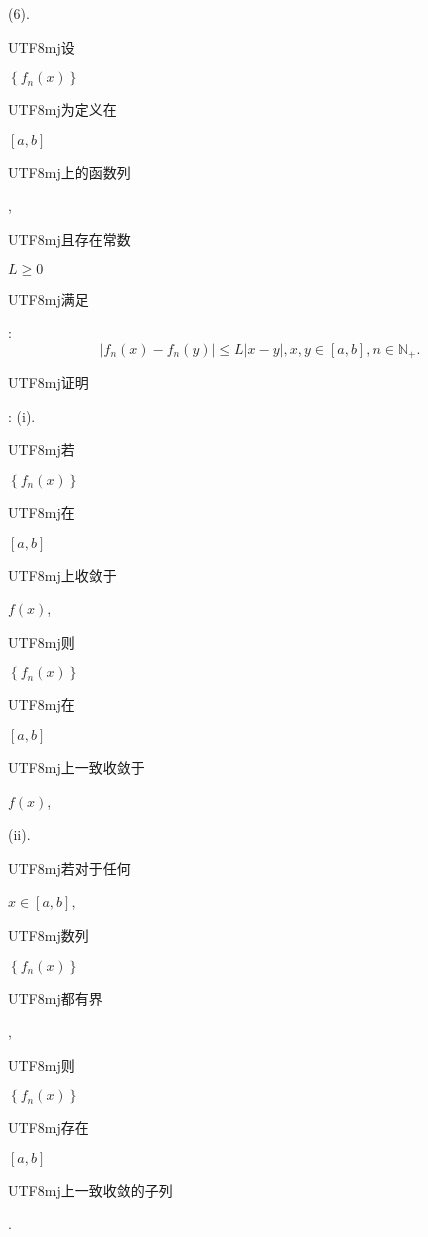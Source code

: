 \documentclass[10pt]{article}
\begin{document}
(6). \begin{CJK}{UTF8}{mj}设\end{CJK} $\left\{f_{n}(x)\right\}$ \begin{CJK}{UTF8}{mj}为定义在\end{CJK} $[a, b]$ \begin{CJK}{UTF8}{mj}上的函数列\end{CJK}, \begin{CJK}{UTF8}{mj}且存在常数\end{CJK} $L \geqslant 0$ \begin{CJK}{UTF8}{mj}满足\end{CJK}:
$$
\left|f_{n}(x)-f_{n}(y)\right| \leqslant L|x-y|, x, y \in[a, b], n \in \mathbb{N}_{+} .
$$
\begin{CJK}{UTF8}{mj}证明\end{CJK}: (i). \begin{CJK}{UTF8}{mj}若\end{CJK} $\left\{f_{n}(x)\right\}$ \begin{CJK}{UTF8}{mj}在\end{CJK} $[a, b]$ \begin{CJK}{UTF8}{mj}上收敛于\end{CJK} $f(x)$, \begin{CJK}{UTF8}{mj}则\end{CJK} $\left\{f_{n}(x)\right\}$ \begin{CJK}{UTF8}{mj}在\end{CJK} $[a, b]$ \begin{CJK}{UTF8}{mj}上一致收敛于\end{CJK} $f(x)$,

(ii). \begin{CJK}{UTF8}{mj}若对于任何\end{CJK} $x \in[a, b]$, \begin{CJK}{UTF8}{mj}数列\end{CJK} $\left\{f_{n}(x)\right\}$ \begin{CJK}{UTF8}{mj}都有界\end{CJK}, \begin{CJK}{UTF8}{mj}则\end{CJK} $\left\{f_{n}(x)\right\}$ \begin{CJK}{UTF8}{mj}存在\end{CJK} $[a, b]$ \begin{CJK}{UTF8}{mj}上一致收敛的子列\end{CJK}.
\end{document}
